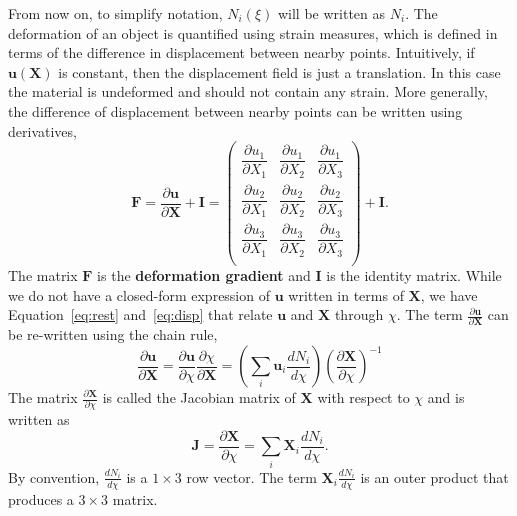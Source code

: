 From now on, to simplify notation, $N_i(\xi)$ will be written as $N_i$.
The deformation of an object is quantified using strain measures,
which is defined in terms of the difference in displacement between nearby points.
Intuitively, if $\mathbf{u}(\mathbf{X})$ is constant, then the displacement field is just a translation. In this case the material is undeformed and should not contain any strain.
More generally, the difference of displacement between nearby points can be written using derivatives,
\[
\mathbf{F}=\frac{\partial \mathbf{u}}{\partial \mathbf{X}}+\mathbf{I}
=\begin{pmatrix}
\dfrac{\partial u_1}{\partial X_1} & \dfrac{\partial u_1}{\partial X_2}&\dfrac{\partial u_1}{\partial X_3}\\
\dfrac{\partial u_2}{\partial X_1} & \dfrac{\partial u_2}{\partial X_2}&\dfrac{\partial u_2}{\partial X_3}\\
\dfrac{\partial u_3}{\partial X_1} & \dfrac{\partial u_3}{\partial X_2}&\dfrac{\partial u_3}{\partial X_3}\\
\end{pmatrix}+\mathbf{I}.
\]
The matrix $\mathbf{F}$ is the \textbf{deformation gradient} and $\mathbf{I}$ is the identity matrix.
While we do not have a closed-form expression of $\mathbf{u}$ written in terms of $\mathbf{X}$,
we have Equation~\ref{eq:rest} and~\ref{eq:disp} that relate $\mathbf{u}$ and $\mathbf{X}$ through $\chi$.
The term $\frac{\partial \mathbf{u}}{\partial \mathbf{X}}$ can be re-written using the chain rule,
\begin{equation}
\frac{\partial \mathbf{u}}{\partial \mathbf{X}}=
\frac{\partial \mathbf{u}}{\partial \chi}
\frac{\partial \chi}{\partial \mathbf{X}}=
(\sum_i\mathbf{u}_i\frac{dN_i}{d\chi})(\frac{\partial \mathbf{X}}{\partial \chi})^{-1}
\label{eq:dudX}
\end{equation}
The matrix $\frac{\partial \mathbf{X}}{\partial \chi}$ is called the Jacobian matrix of $\mathbf{X}$ with respect to $\chi$ and is written as
\[
\mathbf{J}=\frac{\partial \mathbf{X}}{\partial \chi}
= \sum_i\mathbf{X}_i\frac{dN_i}{d\chi}.
\]
By convention, $\frac{dN_i}{d\chi}$ is a $1\times 3$ row vector.
The term $\mathbf{X}_i\frac{dN_i}{d\chi}$ is an outer product that produces a $3\times 3$ matrix.

